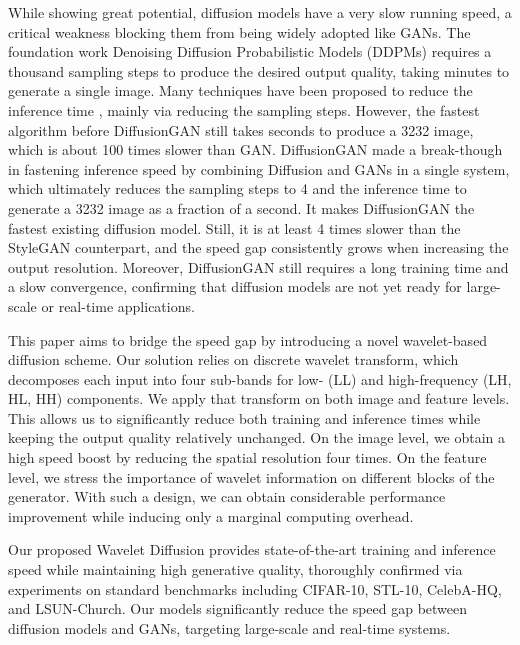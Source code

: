 \documentclass[10pt,twocolumn,letterpaper]{article}
\begin{document}
While showing great potential, diffusion models have a very slow running speed, a critical weakness blocking them from being widely adopted like GANs. The foundation work Denoising Diffusion Probabilistic Models (DDPMs) \cite{ho2020denoising} requires a thousand sampling steps to produce the desired output quality, taking minutes to generate a single image. Many techniques have been proposed to reduce the inference time \cite{song2020denoising,kong2021fast}, mainly via reducing the sampling steps. However, the fastest algorithm before DiffusionGAN still takes seconds to produce a 3232 image, which is about 100 times slower than GAN. DiffusionGAN \cite{xiao2021tackling} made a break-though in fastening inference speed by combining Diffusion and GANs in a single system, which ultimately reduces the sampling steps to 4 and the inference time to generate a 3232 image as a fraction of a second. It makes DiffusionGAN the fastest existing diffusion model. Still, it is at least 4 times slower than the StyleGAN counterpart, and the speed gap consistently grows when increasing the output resolution. Moreover, DiffusionGAN still requires a long training time and a slow convergence, confirming that diffusion models are not yet ready for large-scale or real-time applications.



This paper aims to bridge the speed gap by introducing a novel wavelet-based diffusion scheme. Our solution relies on discrete wavelet transform, which decomposes each input into four sub-bands for low- (LL) and high-frequency (LH, HL, HH) components. We apply that transform on both image and feature levels. This allows us to significantly reduce both training and inference times while keeping the output quality relatively unchanged. On the image level, we obtain a high speed boost by reducing the spatial resolution four times. On the feature level, we stress the importance of wavelet information on different blocks of the generator. With such a design, we can obtain considerable performance improvement while inducing only a marginal computing overhead.  

Our proposed Wavelet Diffusion provides state-of-the-art training and inference speed while maintaining high generative quality, thoroughly confirmed via experiments on standard benchmarks including CIFAR-10, STL-10, CelebA-HQ, and LSUN-Church. Our models significantly reduce the speed gap between diffusion models and GANs, targeting large-scale and real-time systems.
\end{document}
